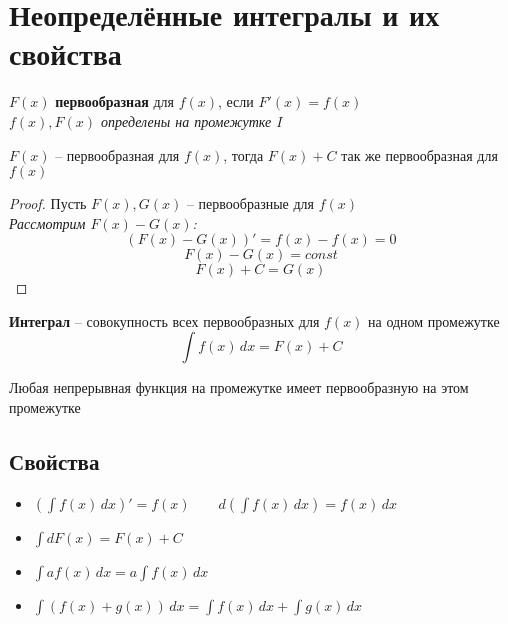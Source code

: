 \section{Неопределённые интегралы и их свойства}

\begin{definition}
$F(x)$ \textbf{первообразная} для $f(x)$, если $F'(x) = f(x)$ \\
\textit{$f(x), F(x)$ определены на промежутке $I$}
\end{definition}

\begin{theorem}
$F(x)$ --  первообразная для $f(x)$, тогда $F(x) + C$ так же первообразная для $f(x)$
\end{theorem}
\begin{proof}
Пусть $F(x), G(x)$ -- первообразные для $f(x)$ \\
\textit{Рассмотрим $F(x) - G(x)$:}
$$(F(x)- G(x))' = f(x) - f(x) = 0$$
$$F(x) - G(x) = const$$
$$F(x) + C = G(x)$$
\end{proof}

\begin{definition}
\textbf{Интеграл} -- совокупность всех первообразных для $f(x)$ на одном промежутке
$$\int f(x)\,dx = F(x) + C$$
\end{definition}

\begin{note}
Любая непрерывная функция на промежутке имеет первообразную на этом промежутке
\end{note}

\subsection{Свойства}

\begin{itemize}
  \item $(\int f(x)\,dx)' = f(x) \qquad d(\int f(x)\,dx) = f(x)\,dx$
  \item $\int dF(x) = F(x) + C$
  \item $\int af(x)\,dx = a\int f(x)\,dx$
  \item $\int (f(x) + g(x))\,dx = \int f(x)\,dx + \int g(x)\,dx$
\end{itemize}
